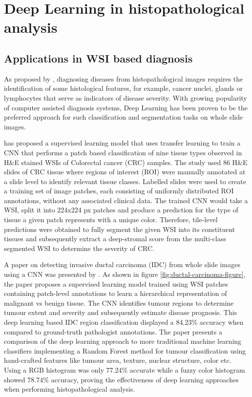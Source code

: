 \documentclass{l4proj}
\begin{document}
\section{Deep Learning in histopathological analysis} \label{dl-application-background-section}
\subsection{Applications in WSI based diagnosis} \label{dl-application-background}
As proposed by \cite{gurcan2009histopathological}, diagnosing diseases from histopathological images requires the identification of some histological features, for example, cancer nuclei, glands or lymphocytes that serve as indicators of disease severity. With growing popularity of computer assisted diagnosis systems, Deep Learning has been proven to be the preferred approach for such classification and segmentation tasks on whole slide images. 

\cite{Kather2019} has proposed a supervised learning model that uses transfer learning to train a CNN that performs a patch based classification of nine tissue types observed in H\&E stained WSIs of Colorectal cancer (CRC) samples. The study used 86 H\&E slides of CRC tissue where regions of interest (ROI) were manually annotated at a slide level to identify relevant tissue classes. Labelled slides were used to create a training set of image patches, each consisting of uniformly distributed ROI annotations, without any associated clinical data. The trained CNN would take a WSI, split it into 224x224 px patches and produce a prediction for the type of tissue a given patch represents with a unique color. Therefore, tile-level predictions were obtained to fully segment the given WSI into its constituent tissues and subsequently extract a deep-stromal score from the multi-class segmented WSI to determine the severity of CRC. 

A paper on detecting invasive ductal carcinoma (IDC) from whole slide images using a CNN was presented by \cite{cruz2014automatic}. As shown in figure \ref{fig:ductal-carcinoma-figure}, the paper proposes a supervised learning model trained using WSI patches containing patch-level annotations to learn a hierarchical  representation of malignant vs benign tissue. The CNN identifies tumour regions to determine tumour extent and severity and subsequently estimate disease prognosis. This deep learning based IDC region classification displayed a 84.23\% accuracy when compared to ground-truth pathologist annotations. The paper presents a comparison of the deep learning approach to more traditional machine learning classifiers implementing a Random Forest method for tumour classification using hand-crafted features like tumour area, texture, nuclear structure, color etc. Using a RGB histogram was only 77.24\% accurate while a fuzzy color histogram showed 78.74\% accuracy, proving the effectiveness of deep learning approaches when performing histopathological analysis. 
\end{document}
